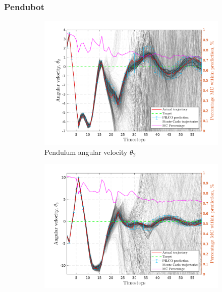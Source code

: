 \subsubsection{Pendubot}
 \begin{figure}[htp!]    
    \begin{subfigure}[b]{1\linewidth}
    \centering
    \includegraphics[height=0.4\textheight,width=1\textwidth]{Chapter3/Figures/pen_MC_rollout_Ep_40_Dim_1.png} 
    \caption{Pendulum angular velocity $\dot \theta_{2}$} 
    \label{Fig:Re-pen-cart-position} 
  \end{subfigure} 
  \hspace{\fill}  %
  \begin{subfigure}[b]{1\linewidth}
    \centering
    \includegraphics[height=0.4\textheight,width=1\textwidth]{Chapter3/Figures/pen_MC_rollout_Ep_40_Dim_2.png} 

\end{subfigure}
\end{figure}
